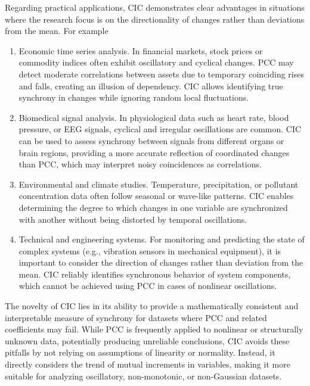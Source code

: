 \documentclass[aos]{imsart}
\newcommand{\cic}{\text{CIC}}
\newcommand{\pcc}{\text{PCC}}
\begin{document}
Regarding practical applications, $\cic$ demonstrates clear advantages in situations where the research focus is on the directionality of changes rather than deviations from the mean. For example
\begin{enumerate}
\item Economic time series analysis. In financial markets, stock prices or commodity indices often exhibit oscillatory and cyclical changes. $\pcc$ may detect moderate correlations between assets due to temporary coinciding rises and falls, creating an illusion of dependency. $\cic$ allows identifying true synchrony in changes while ignoring random local fluctuations.

\item Biomedical signal analysis. In physiological data such as heart rate, blood pressure, or EEG signals, cyclical and irregular oscillations are common. $\cic$ can be used to assess synchrony between signals from different organs or brain regions, providing a more accurate reflection of coordinated changes than $\pcc$, which may interpret noisy coincidences as correlations.

\item Environmental and climate studies. Temperature, precipitation, or pollutant concentration data often follow seasonal or wave-like patterns. $\cic$ enables determining the degree to which changes in one variable are synchronized with another without being distorted by temporal oscillations.

\item Technical and engineering systems. For monitoring and predicting the state of complex systems (e.g., vibration sensors in mechanical equipment), it is important to consider the direction of changes rather than deviation from the mean. $\cic$ reliably identifies synchronous behavior of system components, which cannot be achieved using $\pcc$ in cases of nonlinear oscillations.
\end{enumerate}

The novelty of $\cic$ lies in its ability to provide a mathematically consistent and interpretable measure of synchrony for datasets where $\pcc$ and related coefficients may fail. While $\pcc$ is frequently applied to nonlinear or structurally unknown data, potentially producing unreliable conclusions, $\cic$ avoids these pitfalls by not relying on assumptions of linearity or normality. Instead, it directly considers the trend of mutual increments in variables, making it more suitable for analyzing oscillatory, non-monotonic, or non-Gaussian datasets.
\end{document}
